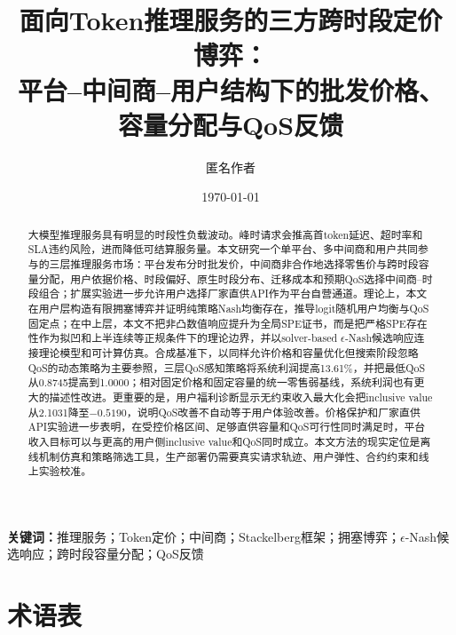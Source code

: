 \documentclass[UTF8,11pt]{ctexart}
\title{\textbf{面向Token推理服务的三方跨时段定价博弈：\\
平台--中间商--用户结构下的批发价格、容量分配与QoS反馈}}
\author{匿名作者}
\date{\today}
\begin{document}
\maketitle

\begin{abstract}
大模型推理服务具有明显的时段性负载波动。峰时请求会推高首token延迟、超时率和SLA违约风险，进而降低可结算服务量。本文研究一个单平台、多中间商和用户共同参与的三层推理服务市场：平台发布分时批发价，中间商非合作地选择零售价与跨时段容量分配，用户依据价格、时段偏好、原生时段分布、迁移成本和预期QoS选择中间商--时段组合；扩展实验进一步允许用户选择厂家直供API作为平台自营通道。理论上，本文在用户层构造有限拥塞博弈并证明纯策略Nash均衡存在，推导logit随机用户均衡与QoS固定点；在中上层，本文不把非凸数值响应提升为全局SPE证书，而是把严格SPE存在性作为拟凹和上半连续等正规条件下的理论边界，并以solver-based $\epsilon$-Nash候选响应连接理论模型和可计算仿真。合成基准下，以同样允许价格和容量优化但搜索阶段忽略QoS的动态策略为主要参照，三层QoS感知策略将系统利润提高13.61\%，并把最低QoS从0.8745提高到1.0000；相对固定价格和固定容量的统一零售弱基线，系统利润也有更大的描述性改进。更重要的是，用户福利诊断显示无约束收入最大化会把inclusive value从2.1031降至$-0.5190$，说明QoS改善不自动等于用户体验改善。价格保护和厂家直供API实验进一步表明，在受控价格区间、足够直供容量和QoS可行性同时满足时，平台收入目标可以与更高的用户侧inclusive value和QoS同时成立。本文方法的现实定位是离线机制仿真和策略筛选工具，生产部署仍需要真实请求轨迹、用户弹性、合约约束和线上实验校准。
\end{abstract}

\noindent\textbf{关键词：}推理服务；Token定价；中间商；Stackelberg框架；拥塞博弈；$\epsilon$-Nash候选响应；跨时段容量分配；QoS反馈

\section*{术语表}
\label{sec:nomenclature}
\end{document}
